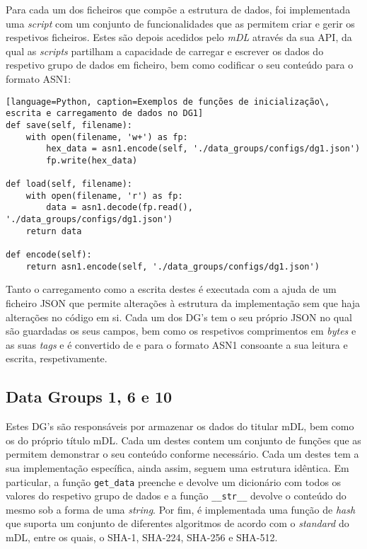 
Para cada um dos ficheiros que compõe a estrutura de dados, foi implementada uma \textit{script} com um conjunto de funcionalidades que as permitem criar e gerir os respetivos ficheiros. Estes são depois acedidos pelo \textit{mDL} através da sua API, da qual as \textit{scripts} partilham a capacidade de carregar e escrever os dados do respetivo grupo de dados em ficheiro, bem como codificar o seu conteúdo	para o formato ASN1:

\begin{verbatim}[language=Python, caption=Exemplos de funções de inicialização\, escrita e carregamento de dados no DG1]
def save(self, filename):
    with open(filename, 'w+') as fp:
        hex_data = asn1.encode(self, './data_groups/configs/dg1.json')
        fp.write(hex_data)

def load(self, filename):
    with open(filename, 'r') as fp:
        data = asn1.decode(fp.read(), './data_groups/configs/dg1.json')
    return data

def encode(self):
    return asn1.encode(self, './data_groups/configs/dg1.json')
\end{verbatim}

Tanto o carregamento como a escrita destes é executada com a ajuda de um ficheiro JSON que permite alterações à estrutura da implementação sem que haja alterações no código em si. Cada um dos DG's tem o seu próprio JSON no qual são guardadas os seus campos, bem como os respetivos comprimentos em \textit{bytes} e as suas \textit{tags} e é convertido de e para o formato ASN1 consoante a sua leitura e escrita, respetivamente.

\subsection{Data Groups 1, 6 e 10}

Estes DG's são responsáveis por armazenar os dados do titular mDL, bem como os do próprio título mDL. Cada um destes contem um conjunto de funções que as permitem demonstrar o seu conteúdo conforme necessário. Cada um destes tem a sua implementação específica, ainda assim, seguem uma estrutura idêntica. Em particular, a função \texttt{get_data} preenche e devolve um dicionário com todos os valores do respetivo grupo de dados e a função \texttt{__str__} devolve o conteúdo do mesmo sob a forma de uma \textit{string}. Por fim, é implementada uma função de \textit{hash} que suporta um conjunto de diferentes algoritmos de acordo com o \textit{standard} do mDL, entre os quais, o SHA-1, SHA-224, SHA-256 e SHA-512.


